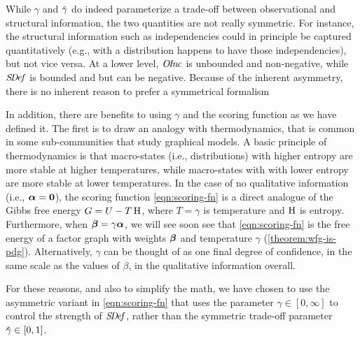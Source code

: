 While $\gamma$ and $\zogamma$ do indeed parameterize a trade-off between observational and structural information, the two quantities are not really symmetric.
For instance, the structural information such as independencies could in principle be captured quantitatively (e.g., with a distribution happens to have those independencies), but not vice versa. 
At a lower level, $\mathit{O\mskip-2.5muI\mskip-3.5mun\mskip-1.7muc}$ is unbounded and non-negative, while $\mathit{S\mskip-3.5muD\mskip-2.5mue\mskip-1.5muf}$ is bounded and but can be negative. 
Because of the inherent asymmetry, 
    there is no inherent reason to prefer
    a symmetrical formalism

In addition, there are benefits to using $\gamma$ and the scoring function as we have defined it. 
The first is to draw an analogy with thermodynamics, that is 
    common in some sub-communities that study graphical models.
A basic principle of thermodynamics is that
    macro-states (i.e., distributions) with higher entropy are more stable at higher temperatures, while macro-states with with lower entropy are more stable at lower temperatures.
In the case of no qualitative information (i.e., $\boldsymbol\alpha = \mathbf 0$),
    the scoring function \eqref{eqn:scoring-fn}
    is a direct analogue of the Gibbs free energy $G = U - T \operatorname{\mathrm{H}}$,
    where $T = \gamma$ is temperature and $\operatorname{\mathrm{H}}$ is entropy. 
Furthermore, when $\boldsymbol\beta = \gamma \boldsymbol\alpha$,
    we will see soon see that \eqref{eqn:scoring-fn} is the free energy
    of a factor graph with weights $\boldsymbol\beta$ and temperature $\gamma$
    (\cref{theorem:wfg-is-pdg}).
Alternatively, $\gamma$ can be thought of as one final degree of confidence, in the same scale as the values of $\beta$, in the qualitative information overall.

For these reasons, and also to simplify the math, we have chosen to use the asymmetric variant in \eqref{eqn:scoring-fn} that uses the parameter $\gamma \in [0,\infty]$ to control the strength of $\mathit{S\mskip-3.5muD\mskip-2.5mue\mskip-1.5muf}$, rather than the symmetric trade-off parameter $\zogamma \in [0,1]$.


